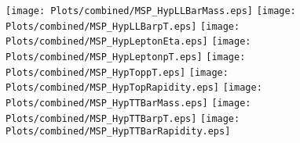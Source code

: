\documentclass[a4paper,10pt]{article}
\begin{document}
\newpage
\texttt{[image: Plots/combined/MSP\_HypLLBarMass.eps]}
\texttt{[image: Plots/combined/MSP\_HypLLBarpT.eps]}
\texttt{[image: Plots/combined/MSP\_HypLeptonEta.eps]}
\texttt{[image: Plots/combined/MSP\_HypLeptonpT.eps]}
\texttt{[image: Plots/combined/MSP\_HypToppT.eps]}
\texttt{[image: Plots/combined/MSP\_HypTopRapidity.eps]}
\texttt{[image: Plots/combined/MSP\_HypTTBarMass.eps]}
\texttt{[image: Plots/combined/MSP\_HypTTBarpT.eps]}
\texttt{[image: Plots/combined/MSP\_HypTTBarRapidity.eps]}
\end{document}
